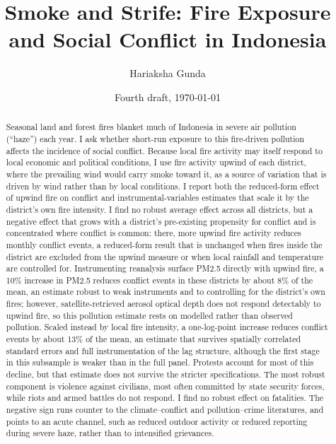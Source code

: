 \documentclass[12pt]{article}
\title{Smoke and Strife: Fire Exposure and Social Conflict in Indonesia}
\author{Hariaksha Gunda}
\affil{The University of Alabama}
\date{Fourth draft, \today}
\begin{document}
\maketitle

\begin{abstract}
Seasonal land and forest fires blanket much of Indonesia in severe air pollution (``haze'') each year. I ask whether short-run exposure to this fire-driven pollution affects the incidence of social conflict. Because local fire activity may itself respond to local economic and political conditions, I use fire activity upwind of each district, where the prevailing wind would carry smoke toward it, as a source of variation that is driven by wind rather than by local conditions. I report both the reduced-form effect of upwind fire on conflict and instrumental-variables estimates that scale it by the district's own fire intensity. I find no robust average effect across all districts, but a negative effect that grows with a district's pre-existing propensity for conflict and is concentrated where conflict is common: there, more upwind fire activity reduces monthly conflict events, a reduced-form result that is unchanged when fires inside the district are excluded from the upwind measure or when local rainfall and temperature are controlled for. Instrumenting reanalysis surface PM2.5 directly with upwind fire, a 10\% increase in PM2.5 reduces conflict events in these districts by about 8\% of the mean, an estimate robust to weak instruments and to controlling for the district's own fires; however, satellite-retrieved aerosol optical depth does not respond detectably to upwind fire, so this pollution estimate rests on modelled rather than observed pollution. Scaled instead by local fire intensity, a one-log-point increase reduces conflict events by about 13\% of the mean, an estimate that survives spatially correlated standard errors and full instrumentation of the lag structure, although the first stage in this subsample is weaker than in the full panel. Protests account for most of this decline, but that estimate does not survive the stricter specifications. The most robust component is violence against civilians, most often committed by state security forces, while riots and armed battles do not respond. I find no robust effect on fatalities. The negative sign runs counter to the climate--conflict and pollution--crime literatures, and points to an acute channel, such as reduced outdoor activity or reduced reporting during severe haze, rather than to intensified grievances.
\end{abstract}
\end{document}
